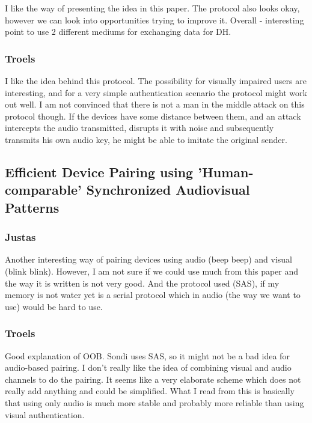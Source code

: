 \documentclass[12pt]{article}
\begin{document}
I like the way of presenting the idea in this paper. The protocol also looks okay, however we can look into opportunities trying to improve it.
Overall - interesting point to use 2 different mediums for exchanging data for DH.

\subsubsection{Troels}
\label{subs:Troels}

I like the idea behind this protocol. The possibility for visually impaired users are interesting, and for a very simple authentication scenario the protocol might work out well. I am not convinced that there is not a man in the middle attack on this protocol though. If the devices have some distance between them, and an attack intercepts the audio transmitted, disrupts it with noise and subsequently transmits his own audio key, he might be able to imitate the original sender.

\subsection{Efficient Device Pairing using 'Human-comparable' Synchronized Audiovisual Patterns}
\label{sub:Efficient Device Pairing using 'Human-comparable' Synchronized Audiovisual Patterns}

\subsubsection{Justas}
\label{subs:Justas}

Another interesting way of pairing devices using audio (beep beep) and visual (blink blink). However, I am not sure if we could use much from this paper and the way it is written is not very good. And the protocol used (SAS), if my memory is not water yet is a serial protocol which in audio (the way we want to use) would be hard to use.

\subsubsection{Troels}
\label{subs:Troels}

Good explanation of OOB. Sondi uses SAS, so it might not be a bad idea for audio-based pairing.
I don't really like the idea of combining visual and audio channels to do the pairing. It seems like a very elaborate scheme which does not really add anything and could be simplified.
What I read from this is basically that using only audio is much more stable and probably more reliable than using visual authentication.
\end{document}
